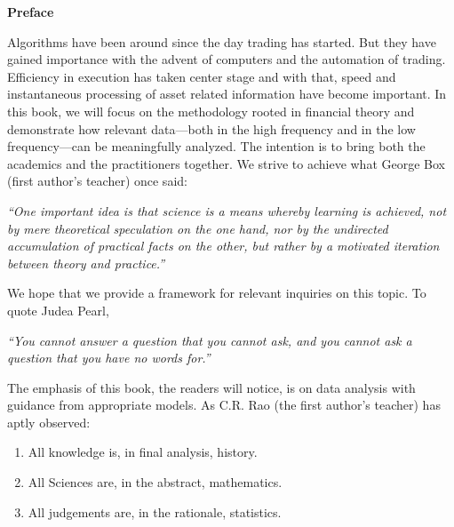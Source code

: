 \begin{center} {\large\bfseries Preface} \end{center}

Algorithms have been around since the day trading has started. But they have gained importance with the advent of computers and the automation of trading. Efficiency in execution has taken center stage and with that, speed and instantaneous processing of asset related information have become important. In this book, we will focus on the methodology rooted in financial theory and demonstrate how relevant data---both in the high frequency and in the low frequency---can be meaningfully analyzed. The intention is to bring both the academics and the practitioners together. We strive to achieve what George Box (first author's teacher) once said: \par
        \begin{center}
        \begin{minipage}[t]{0.7\textwidth}
        	\raggedright
          	{\itshape``One important idea is that science is a means whereby learning is achieved, not by mere theoretical speculation on the one hand, nor by the undirected accumulation of practical facts on the other, but rather by a motivated iteration between theory and practice.''}
        \end{minipage} 
        \end{center}

We hope that we provide a framework for relevant inquiries on this topic. To quote Judea Pearl, \par
        \begin{center}
        \begin{minipage}[t]{0.7\textwidth}
        	\raggedright
          	{\itshape``You cannot answer a question that you cannot ask, and you cannot ask a question that you have no words for.''}
        \end{minipage} 
        \end{center}
The emphasis of this book, the readers will notice, is on data analysis with guidance from appropriate models. As C.R. Rao (the first author's teacher) has aptly observed:
	\begin{enumerate}
	\item[] All knowledge is, in final analysis, history.
	\item[] All Sciences are, in the abstract, mathematics.
	\item[] All judgements are, in the rationale, statistics.
	\end{enumerate}


